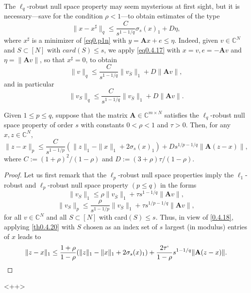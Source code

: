 \begin{remark}
    \label{rmk0.4.24}
    The $\ell_q$-robust null space property may seem mysterious at first sight, but it is necessary---save for the condition $\rho<1$---to obtain estimates of the type
    \begin{equation}
        \|x-x^{\sharp}\|_q \leq \frac{C}{s^{1-1/q}} \sigma_s(x)_1 + D \eta,
        \label{eq0.4.17}
    \end{equation}
    where $x^{\sharp}$ is a minimizer of \cref{eq0.p1n} with $y = \mathbf{A}x + e \leq \eta$. Indeed, given $v \in \mathbb{C}^N$ and $S \subset [N]$ with $card(S) \leq s$, we apply \cref{eq0.4.17} with $x=v, e= -\mathbf{A}v$ and $\eta=\|\mathbf{A}v\|$, so that $x^{\sharp} = 0$, to obtain
    \[
        \|v\|_q \leq \frac{C}{s^{1-1/q}} \|v_{\overline{S}}\|_1 + D \|\mathbf{A}v\|,
    \]
    and in particular
    \[
        \|v_S\|_q \leq \frac{C}{s^{1-1/q}} \|v_{\overline{S}}\|_1 + D \|\mathbf{A}v\|.
    \]
\end{remark}

\begin{theorem}
    \label{th0.4.25}
    Given $1 \leq p \leq q$, suppose that the matrix $\mathbf{A} \in \mathbb{C}^{m \times N}$ satisfies the $\ell_q$-robust null space property of order $s$ with constants $0<\rho<1$ and $\tau > 0$. Then, for any $x,z \in \mathbb{C}^N$,
    \[
        \|z-x\|_p \leq \frac{C}{s^{1-1/p}}\left( \|z\|_1 - \|x\|_1 + 2\sigma_s(x)_1 \right) + D s^{1/p-1/q} \|\mathbf{A}(z-x)\|,
    \]
    where $C := (1+\rho)^2/(1-\rho)$ and $D := (3+\rho)\tau/(1-\rho)$.
\end{theorem}

\begin{proof}
    Let us first remark that the $\ell_p$-robust null space properties imply the $\ell_1$-robust and $\ell_p$-robust null space property $(p \leq q)$ in the forms
    \begin{equation}
        \|v_S\|_1 \leq \rho \|v_{\overline{S}}\|_1 + \tau s^{1-1/q}\|\mathbf{A}v\|,
        \label{eq0.4.18}
    \end{equation}
    \begin{equation}
        \|v_S\|_p \leq \frac{\rho}{s^{1-1/p}}\|v_{\overline{S}}\|_1 + \tau s^{1/p-1/q} \|\mathbf{A}v\|,
        \label{eq0.4.19}
    \end{equation}
    for all $v \in \mathbb{C}^N$ and all $S \subset [N]$ with card$(S) \leq s$. Thus, in view of \cref{0.4.18}, applying \cref{th0.4.20} with $S$ chosen as an index set of $s$ largest (in modulus) entries of $x$ leads to 
    \begin{equation}
         \|z-x\|_1 \leq \frac{1+\rho}{1-\rho}(\|z\|_1 - \|x\|_1 + 2\sigma_s(x)_1) + \frac{2\tau`}{1-\rho}s^{1-1/q} \|\mathbf{A}(z-x)\|.
        \label{eq0.4.20}
    \end{equation}

\end{proof}<++>












